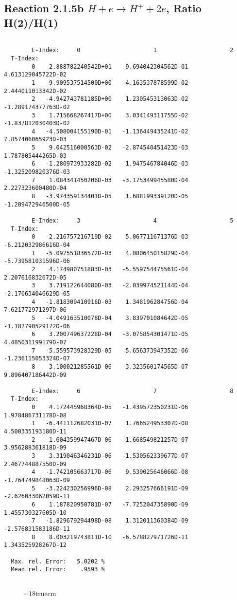\newpage
\subsection{
Reaction 2.1.5b  $H + e \rightarrow H^+ + 2e$, Ratio H(2)/H(1)
}


\begin{verbatim}

        E-Index:     0                     1                     2
  T-Index:
        0   -2.888782240542D+01    9.694042304562D-01    4.613129045722D-02
        1    9.909537514500D+00   -4.163537878599D-02    2.444011013342D-02
        2   -4.942743781185D+00    1.230545313063D-02   -1.289174377763D-02
        3    1.715668267417D+00    3.034149311755D-02   -1.837812030403D-02
        4   -4.508004155190D-01   -1.136449435241D-02    7.857406065923D-03
        5    9.042516000563D-02   -2.874540451423D-03    1.787805444265D-03
        6   -1.280973933282D-02    1.947546784046D-03   -1.325209820376D-03
        7    1.084341450206D-03   -3.175349945580D-04    2.227323600480D-04
        8   -3.974359134401D-05    1.688199339120D-05   -1.209472946500D-05

        E-Index:     3                     4                     5
  T-Index:
        0   -2.216757216719D-02    5.067711671376D-03   -6.212032986616D-04
        1   -5.092551836572D-03    4.080645015829D-04   -5.739581031596D-06
        2    4.174980751883D-03   -5.559754475561D-04    2.207616832672D-05
        3    3.719122644080D-03   -2.039974521144D-04   -2.170634046629D-05
        4   -1.818309410916D-03    1.348196284756D-04    7.621772971297D-06
        5   -4.049163510078D-04    3.839701084642D-05   -1.182790529172D-06
        6    3.200749637228D-04   -3.075854301471D-05    4.485031199179D-07
        7   -5.559573928329D-05    5.656373947352D-06   -1.236115053324D-07
        8    3.100021285561D-06   -3.323560174565D-07    9.896407186442D-09

        E-Index:     6                     7                     8
  T-Index:
        0    4.172445968364D-05   -1.439572350231D-06    1.978486731178D-08
        1   -6.441112682031D-07    1.766524953307D-08    4.500335193180D-11
        2    1.604359947467D-06   -1.668549821257D-07    3.956288361818D-09
        3    3.319046346231D-06   -1.530562339677D-07    2.467744887550D-09
        4   -1.742105663717D-06    9.539025646066D-08   -1.764749848063D-09
        5   -3.224230256996D-08    2.293257666191D-09   -2.626033062059D-11
        6    1.187820950781D-07   -7.725204735890D-09    1.455730327605D-10
        7   -1.829679294498D-08    1.312011360384D-09   -2.576831583186D-11
        8    8.003219743811D-10   -6.578827971726D-11    1.343525928267D-12

  Max. rel. Error:   5.0202 %
  Mean rel. Error:    .9593 %


\end{verbatim}
\begin{figure} \label{2.1.5b}
\epsfxsize=18truecm
\end{figure}

